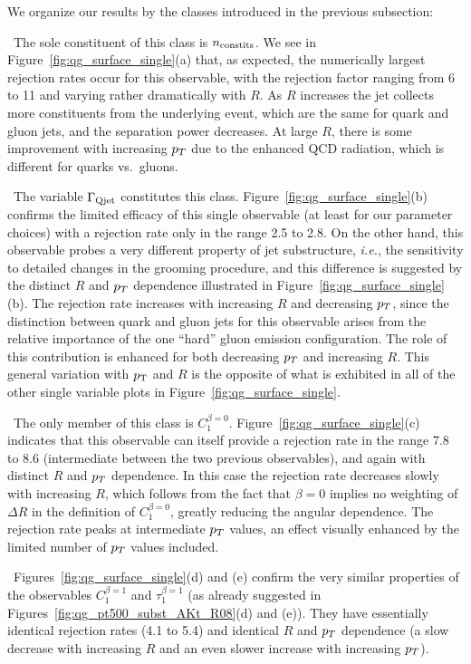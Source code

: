  We organize our results by the classes introduced in the previous subsection:

~The sole constituent of this class is $n_{\rm constits}$. We see in  Figure~\ref{fig:qg_surface_single}(a) that, as expected,  the numerically largest rejection rates occur
for this observable, with the rejection factor ranging from 6 to 11 and 
varying rather dramatically with $R$.  As $R$ increases the jet collects more constituents from the underlying event, which are the same
for quark and gluon jets, and the separation power decreases.  At large $R$, there is some improvement with increasing $p_T$ due to the 
enhanced QCD radiation, which is different for quarks vs.~gluons.  

~The variable $\Gamma_{\rm Qjet}$ constitutes this class. Figure~\ref{fig:qg_surface_single}(b) confirms the 
limited efficacy of this single
observable (at least for our parameter choices) with a rejection rate only in the range 2.5 to 2.8.  On the other hand, this 
observable probes a very different
property of jet substructure, \textit{i.e.}, the sensitivity to detailed changes in the grooming procedure, and this difference is suggested
by the distinct $R$ and $p_T$ dependence illustrated in  Figure~\ref{fig:qg_surface_single}(b).  The rejection rate increases with increasing $R$
and decreasing $p_T$, since the distinction between quark and gluon jets for this observable arises from the relative importance of the one
``hard'' gluon emission configuration.  The role of this contribution is enhanced for both decreasing $p_T$ and increasing $R$. 
This general variation with $p_{\mathrm{T}}$ and $R$ is the opposite of what is exhibited in all of the other single variable plots in Figure~\ref{fig:qg_surface_single}.


~The only member of this class is $C_1^{\beta=0}$. Figure~\ref{fig:qg_surface_single}(c) indicates that this observable  can itself provide a rejection rate in the range
7.8 to 8.6 (intermediate between the two previous observables), and again with distinct $R$ and $p_T$ dependence.  In this case the rejection
rate decreases slowly with increasing $R$, which follows from the fact that $\beta = 0$ implies no weighting of $\Delta R$ in the definition of $C_1^{\beta=0}$, greatly reducing 
the angular dependence.
The rejection rate peaks at intermediate $p_T$ values, an effect visually enhanced by the limited number of 
$p_T$ values included.  


~Figures~\ref{fig:qg_surface_single}(d) and (e)  confirm
the very similar properties of the observables $C_1^{\beta=1}$ and $\tau_1^{\beta=1}$ (as already suggested in
Figures~\ref{fig:qg_pt500_subst_AKt_R08}(d) and (e)). They have
 essentially identical rejection rates (4.1 to 5.4) and identical $R$ and $p_T$ dependence (a slow decrease with increasing $R$ and an even
slower increase with increasing $p_T$).  

